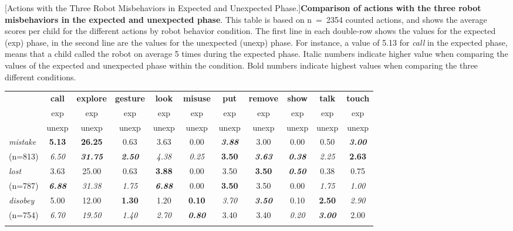 \documentclass{sig-alternate}
\begin{document}
\begin{table}[H]
[Actions with the Three Robot Misbehaviors in Expected and Unexpected Phase.]{\small \textbf{Comparison of actions with the three robot misbehaviors in the expected and unexpected phase}. This table is based on n~=~2354 counted actions, and shows the average scores per child for the different actions by robot behavior condition. The first line in each double-row shows the values for the expected (exp) phase, in the second line are the values for the unexpected (unexp) phase. For instance, a value of 5.13 for \textit{call} in the expected phase, means that a child called the robot on average 5 times during the expected phase. Italic numbers indicate higher value when comparing the values of the expected and unexpected phase within the condition. Bold numbers indicate highest values when comparing the three different conditions.}
\label{tab:domino-conditions}       %
\centering
\footnotesize
\begin{tabular}{lcccccccccc}
\noalign{\smallskip}\noalign{\smallskip}\hline\noalign{\smallskip}
	 & \textbf{call} & \textbf{explore} & \textbf{gesture} & \textbf{look} & \textbf{misuse} & \textbf{put} & \textbf{remove} & \textbf{show} & \textbf{talk} & \textbf{touch} \\ 
	 & exp & exp & exp & exp & exp & exp & exp & exp & exp & exp \\
	 & unexp & unexp & unexp & unexp & unexp & unexp & unexp & unexp & unexp & unexp \\
\noalign{\smallskip}\hline\hline
	
	\textit{mistake} & \textbf{5.13} & \textbf{26.25} & 0.63 & 3.63 & 0.00 & \textit{\textbf{3.88}} & 3.00 & 0.00 & 0.50 & \textit{\textbf{3.00}} \\
	(n=813) & \textit{6.50} & \textit{\textbf{31.75}} & \textit{\textbf{2.50}} & \textit{4.38} & \textit{0.25} & \textbf{3.50} & \textit{\textbf{3.63}} & \textit{\textbf{0.38}} & \textit{2.25} & \textbf{2.63} \vspace{0.2cm} \\ 

	\textit{lost} & 3.63 & 25.00 & 0.63 & \textbf{3.88} & 0.00 & 3.50 & \textbf{3.50} & \textit{\textbf{0.50}} & 0.38 & 0.75 \\
	 (n=787) & \textit{\textbf{6.88}} & \textit{31.38} & \textit{1.75} & \textit{\textbf{6.88}} & 0.00 & \textbf{3.50} & 3.50 & 0.00 & \textit{1.75} & \textit{1.00} \vspace{0.2cm} \\
	
	\textit{disobey} & 5.00 & 12.00 & \textbf{1.30} & 1.20 & \textbf{0.10} & \textit{3.70} & \textit{\textbf{3.50}} & 0.10 & \textbf{2.50} & \textit{2.90} \\
	(n=754) & \textit{6.70} & \textit{19.50} & \textit{1.40} & \textit{2.70} & \textit{\textbf{0.80}} & 3.40 & 3.40 & \textit{0.20} & \textit{\textbf{3.00}} & 2.00 \\

\noalign{\smallskip}\hline
\end{tabular}
\end{table}	
\end{document}
